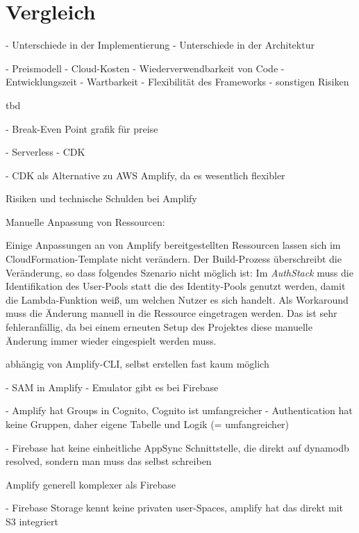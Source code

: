 \chapter{Vergleich}

- Unterschiede in der Implementierung
- Unterschiede in der Architektur

- Preismodell
- Cloud-Kosten
- Wiederverwendbarkeit von Code
- Entwicklungszeit
- Wartbarkeit
- Flexibilität des Frameworks
- sonstigen Risiken

tbd

- Break-Even Point grafik für preise

- Serverless
- CDK

- CDK als Alternative zu AWS Amplify, da es wesentlich flexibler

Risiken und technische Schulden bei Amplify

Manuelle Anpassung von Ressourcen:

Einige Anpassungen an von Amplify bereitgestellten Ressourcen lassen sich im CloudFormation-Template nicht verändern. Der Build-Prozess überschreibt die Veränderung, so dass folgendes Szenario nicht möglich ist: Im \textit{AuthStack} muss die Identifikation des User-Pools statt die des Identity-Pools genutzt werden, damit die Lambda-Funktion weiß, um welchen Nutzer es sich handelt. Als Workaround muss die Änderung manuell in die Ressource eingetragen werden. Das ist sehr fehleranfällig, da bei einem erneuten Setup des Projektes diese manuelle Änderung immer wieder eingespielt werden muss.

abhängig von Amplify-CLI, selbst erstellen fast kaum möglich


- SAM in Amplify
- Emulator gibt es bei Firebase

- Amplify hat Groups in Cognito, Cognito ist umfangreicher
- Authentication hat keine Gruppen, daher eigene Tabelle und Logik (= umfangreicher)

- Firebase hat keine einheitliche AppSync Schnittstelle, die direkt auf dynamodb resolved, sondern man muss das selbst schreiben

Amplify generell komplexer als Firebase

- Firebase Storage kennt keine privaten user-Spaces, amplify hat das direkt mit S3 integriert